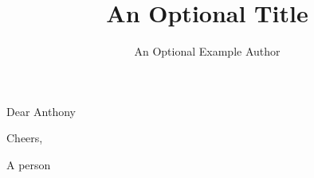 \documentclass{dragonfly-letter}
\title{An Optional Title}
\author{An Optional Example Author}
\begin{document}
\maketitle

Dear Anthony

\lipsum[1-7]

Cheers,

A person
\end{document}
